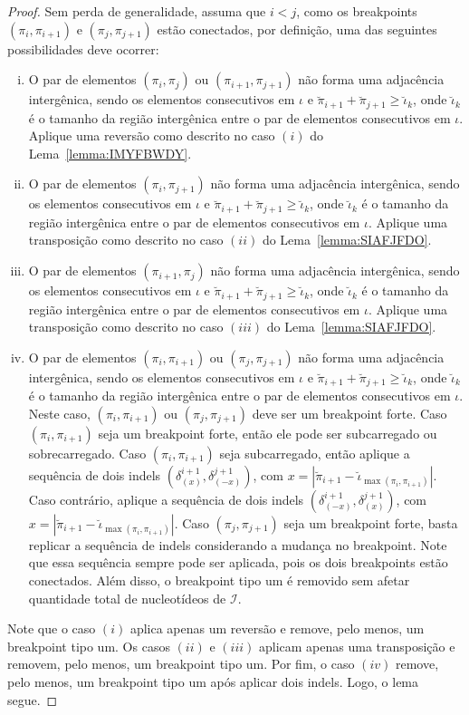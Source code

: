 \begin{proof}
Sem perda de generalidade, assuma que $i < j$, como os breakpoints $(\pi_i,\pi_{i+1})$ e $(\pi_j,\pi_{j+1})$ estão conectados, por definição, uma das seguintes possibilidades deve ocorrer:
\begin{enumerate}[i.]
  \item O par de elementos $(\pi_i,\pi_{j})$ ou $(\pi_{i+1},\pi_{j+1})$ não forma uma adjacência intergênica, sendo os elementos consecutivos em $\iota$ e $\breve\pi_{i+1} + \breve\pi_{j+1} \ge \breve\iota_k$, onde $\breve\iota_k$ é o tamanho da região intergênica entre o par de elementos consecutivos em $\iota$. Aplique uma reversão como descrito no caso $(i)$ do Lema~\ref{lemma:IMYFBWDY}.
  \item O par de elementos $(\pi_i,\pi_{j+1})$ não forma uma adjacência intergênica, sendo os elementos consecutivos em $\iota$ e $\breve\pi_{i+1} + \breve\pi_{j+1} \ge \breve\iota_k$, onde $\breve\iota_k$ é o tamanho da região intergênica entre o par de elementos consecutivos em $\iota$. Aplique uma transposição como descrito no caso $(ii)$ do Lema~\ref{lemma:SIAFJFDO}.
  \item O par de elementos $(\pi_{i+1},\pi_{j})$ não forma uma adjacência intergênica, sendo os elementos consecutivos em $\iota$ e $\breve\pi_{i+1} + \breve\pi_{j+1} \ge \breve\iota_k$, onde $\breve\iota_k$ é o tamanho da região intergênica entre o par de elementos consecutivos em $\iota$. Aplique uma transposição como descrito no caso $(iii)$ do Lema~\ref{lemma:SIAFJFDO}.
  \item O par de elementos $(\pi_{i},\pi_{i+1})$ ou $(\pi_{j},\pi_{j+1})$ não forma uma adjacência intergênica, sendo os elementos consecutivos em $\iota$ e $\breve\pi_{i+1} + \breve\pi_{j+1} \ge \breve\iota_k$, onde $\breve\iota_k$ é o tamanho da região intergênica entre o par de elementos consecutivos em $\iota$. Neste caso, $(\pi_{i},\pi_{i+1})$ ou $(\pi_{j},\pi_{j+1})$ deve ser um breakpoint forte. Caso $(\pi_{i},\pi_{i+1})$ seja um breakpoint forte, então ele pode ser subcarregado ou sobrecarregado. Caso $(\pi_{i},\pi_{i+1})$ seja subcarregado, então aplique a sequência de dois indels $(\delta^{i+1}_{(x)}, \delta^{j+1}_{(-x)})$, com $x=|\breve\pi_{i+1} - \breve\iota_{\max(\pi_i, \pi_{i+1})}|$. Caso contrário, aplique a sequência de dois indels $(\delta^{i+1}_{(-x)}, \delta^{j+1}_{(x)})$, com $x=|\breve\pi_{i+1} - \breve\iota_{\max(\pi_i, \pi_{i+1})}|$. Caso $(\pi_{j},\pi_{j+1})$ seja um breakpoint forte, basta replicar a sequência de indels considerando a mudança no breakpoint. Note que essa sequência sempre pode ser aplicada, pois os dois breakpoints estão conectados. Além disso, o breakpoint tipo um é removido sem afetar quantidade total de nucleotídeos de $\mathcal{I}$.  
\end{enumerate}
Note que o caso $(i)$ aplica apenas um reversão e remove, pelo menos, um breakpoint tipo um. Os casos $(ii)$ e $(iii)$ aplicam apenas uma transposição e removem, pelo menos, um breakpoint tipo um. Por fim, o caso $(iv)$ remove, pelo menos, um breakpoint tipo um após aplicar dois indels. Logo, o lema segue.
\end{proof}

